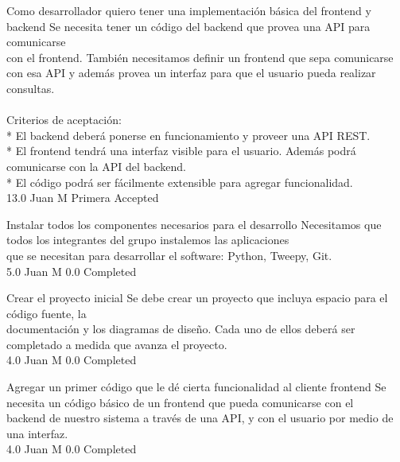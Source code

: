 \vspace{20pt}

	{Como desarrollador quiero tener una implementación básica del frontend y backend} %
	{Se necesita tener un código del backend que provea una API para comunicarse\\
con el frontend. También necesitamos definir un frontend que sepa comunicarse\\
con esa API y además provea un interfaz para que el usuario pueda realizar\\
consultas.\\
  \\
Criterios de aceptación:\\
* El backend deberá ponerse en funcionamiento y proveer una API REST.  \\
* El frontend tendrá una interfaz visible para el usuario. Además podrá comunicarse con la API del backend.  \\
* El código podrá ser fácilmente extensible para agregar funcionalidad.\\
} %
	{} %
	{13.0} %
	{Juan M} %
	{Primera} %
	{Accepted} %

		{Instalar todos los componentes necesarios para el desarrollo} %
		{Necesitamos que todos los integrantes del grupo instalemos las aplicaciones\\
que se necesitan para desarrollar el software: Python, Tweepy, Git.\\
} %
		{5.0} %
		{Juan M} %
		{0.0} %
		{Completed} %

		{Crear el proyecto inicial} %
		{Se debe crear un proyecto que incluya espacio para el código fuente, la\\
documentación y los diagramas de diseño. Cada uno de ellos deberá ser\\
completado a medida que avanza el proyecto.\\
} %
		{4.0} %
		{Juan M} %
		{0.0} %
		{Completed} %

		{Agregar un primer código que le dé cierta funcionalidad al cliente frontend} %
		{Se necesita un código básico de un frontend que pueda comunicarse con el\\
backend de nuestro sistema a través de una API, y con el usuario por medio de\\
una interfaz.\\
} %
		{4.0} %
		{Juan M} %
		{0.0} %
		{Completed} %

